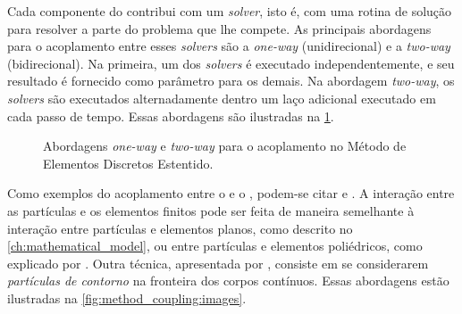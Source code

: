 Cada componente do \XDEM{} contribui com um \textit{solver}, isto é, com uma rotina de solução para resolver a parte do problema que lhe compete. As principais abordagens para o acoplamento entre esses \textit{solvers} são a \textit{one-way} (unidirecional) e a \textit{two-way} (bidirecional). Na primeira, um dos \textit{solvers} é executado independentemente, e seu resultado é fornecido como parâmetro para os demais. Na abordagem \textit{two-way}, os \textit{solvers} são executados alternadamente dentro um laço adicional executado em cada passo de tempo. Essas abordagens são ilustradas na \cref{fig:method_coupling:flowchart}.

\begin{figure}[h]
	\caption{Abordagens \textit{one-way} e \textit{two-way} para o acoplamento no Método de Elementos Discretos Estentido.}
	\centering
	\captionsetup[subfloat]{labelfont=bf}
	\label{fig:method_coupling:flowchart}
	\sourceMe
\end{figure}

Como exemplos do acoplamento entre o \DEM{} e o \FEM{}, podem-se citar  e . A interação entre as partículas e os elementos finitos pode ser feita de maneira semelhante à interação entre partículas e elementos planos, como descrito no \cref{ch:mathematical_model}, ou entre partículas e elementos poliédricos, como explicado por . Outra técnica, apresentada por , consiste em se considerarem \textit{partículas de contorno} na fronteira dos corpos contínuos. Essas abordagens estão ilustradas na \cref{fig:method_coupling:images}.

